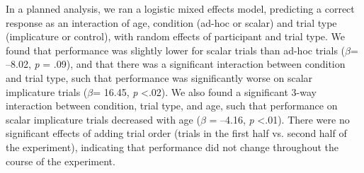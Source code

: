 \documentclass[man]{apa2}
\begin{document}
In a planned analysis, we ran a logistic mixed effects model, predicting a correct response as an interaction of age, condition (ad-hoc or scalar) and trial type (implicature or control), with random effects of participant and trial type. We found that performance was slightly lower for scalar trials than ad-hoc trials ($\beta$= --8.02, \textit{p} = .09), and that there was a significant interaction between condition and trial type, such that performance was significantly worse on scalar implicature trials ($\beta$= 16.45, \textit{p} \textless  .02). We also found a significant 3-way interaction between condition, trial type, and age, such that performance on scalar implicature trials decreased with age ($\beta$ = --4.16, \textit{p} \textless  .01). There were no significant effects of adding trial order (trials in the first half vs. second half of the experiment), indicating that performance did not change throughout the course of the experiment. 

 \begin{figure}[!h]
 	\centering
           \begin{floatrow}
           \end{floatrow}
\end{figure}	
\end{document}
